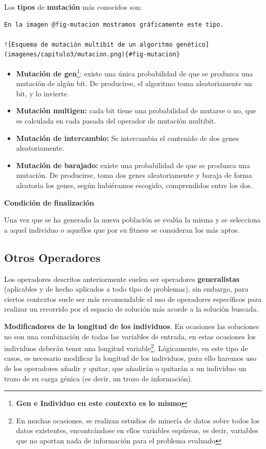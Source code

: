 \documentclass[
  a4paper,
  DIV=11,
  numbers=noendperiod]{scrreprt}
\begin{document}
Los \textbf{tipos} de \textbf{mutación} más conocidos son:

\begin{verbatim}
En la imagen @fig-mutacion mostramos gráficamente este tipo.

![Esquema de mutación multibit de un algoritmo genético](imagenes/capitulo3/mutacion.png){#fig-mutacion}
\end{verbatim}

\begin{itemize}
\item
  \textbf{Mutación de gen}\footnote{\textbf{Gen e Individuo en este
    contexto es lo mismo}}: existe una única probabilidad de que se
  produzca una mutación de algún bit. De producirse, el algoritmo toma
  aleatoriamente un bit, y lo invierte.
\item
  \textbf{Mutación multigen:} cada bit tiene una probabilidad de mutarse
  o no, que es calculada en cada pasada del operador de mutación
  multibit.
\item
  \textbf{Mutación de intercambio:} Se intercambia el contenido de dos
  genes aleatoriamente.
\item
  \textbf{Mutación de barajado:} existe una probabilidad de que se
  produzca una mutación. De producirse, toma dos genes aleatoriamente y
  baraja de forma aleatoria los genes, según hubiéramos escogido,
  comprendidos entre los dos.
\end{itemize}

\textbf{Condición de finalización}

Una vez que se ha generado la nueva población se evalúa la misma y se
selecciona a aquel individuo o aquellos que por su fitness se consideran
los más aptos.

\hypertarget{otros-operadores}{%
\subsection{Otros Operadores}\label{otros-operadores}}

Los operadores descritos anteriormente suelen ser operadores
\textbf{generalistas} (aplicables y de hecho aplicados a todo tipo de
problemas), sin embargo, para ciertos contextos suele ser más
recomendable el uso de operadores específicos para realizar un recorrido
por el espacio de solución más acorde a la solución buscada.

\textbf{Modificadores de la longitud de los individuos}. En ocasiones
las soluciones no son una combinación de todas las variables de entrada,
en estas ocasiones los individuos deberán tener una longitud
variable\footnote{En muchas ocasiones, se realizan estudios de minería
  de datos sobre todos los datos existentes, encontrándose en ellos
  variables espúreas, es decir, variables que no aportan nada de
  información para el problema evaluado}. Lógicamente, en este tipo de
casos, es necesario modificar la longitud de los individuos, para ello
haremos uso de los operadores añadir y quitar, que añadirán o quitarán a
un individuo un trozo de su carga génica (es decir, un trozo de
información).
\end{document}
